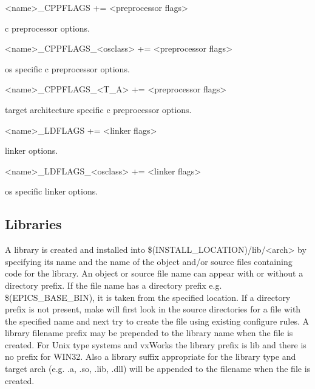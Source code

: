 \begin{description}\item \textless{}name\textgreater{}\_CPPFLAGS += \textless{}preprocessor flags\textgreater{}

\end{description}c preprocessor options.

\begin{description}\item \textless{}name\textgreater{}\_CPPFLAGS\_\textless{}osclass\textgreater{} += \textless{}preprocessor flags\textgreater{}

\end{description}os specific c preprocessor options.

\begin{description}\item \textless{}name\textgreater{}\_CPPFLAGS\_\textless{}T\_A\textgreater{} += \textless{}preprocessor flags\textgreater{}

\end{description}target architecture specific c preprocessor options.

\begin{description}\item \textless{}name\textgreater{}\_LDFLAGS += \textless{}linker flags\textgreater{}

\end{description}linker options.

\begin{description}\item \textless{}name\textgreater{}\_LDFLAGS\_\textless{}osclass\textgreater{} += \textless{}linker flags\textgreater{}

\end{description}os specific linker options.

\subsection{Libraries}

A library is created and installed into \$(INSTALL\_LOCATION)/lib/\textless{}arch\textgreater{} by specifying its name and the name of the 
object and/or source files containing code for the library. An object or source file name can appear with or without a 
directory prefix. If the file name has a directory prefix e.g. \$(EPICS\_BASE\_BIN), it is taken from the specified location. 
If a directory prefix is not present, make will first look in the source directories for a file with the specified name and next 
try to create the file using existing configure rules. A library filename prefix may be prepended to the library name when 
the file is created. For Unix type systems and vxWorks the library prefix is lib and there is no prefix for WIN32. Also a 
library suffix appropriate for the library type and target arch (e.g. .a, .so, .lib, .dll) will be appended to the filename when 
the file is created.

